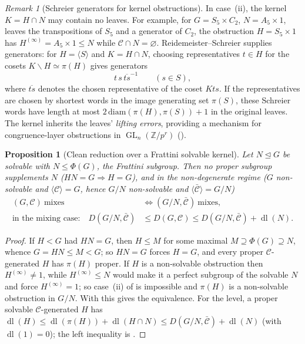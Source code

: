 \documentclass[11pt]{amsart}
\newtheorem{proposition}[proposition]{Proposition}
\theoremstyle{definition}
\theoremstyle{remark}
\newtheorem{remark}[remark]{Remark}
\theoremstyle{plain}
\theoremstyle{plain}
\numberwithin{equation}{section}
\DeclareMathOperator{\GL}{GL}
\newcommand{\Z}{\mathbb{Z}}
\begin{document}
\begin{remark}[Schreier generators for kernel obstructions]
\label{rem:schreier}
In case~(ii), the kernel $K=H\cap N$ may contain no leaves. For example,
for $G=S_5\times C_2$, $N=A_5\times1$, leaves the transpositions of $S_5$ and a
generator of $C_2$, the obstruction $H=S_5\times1$ has $H^{(\infty)}=A_5\times1\le N$ while
$\mathcal C\cap N=\varnothing$. Reidemeister--Schreier supplies generators: for
$H=\langle S\rangle$ and $K=H\cap N$, choosing representatives $t\in H$ for the cosets
$K\backslash H\simeq\pi(H)$ gives generators
\[
t\,s\,\overline{ts}^{-1}\qquad (s\in S),
\]
where $\overline{ts}$ denotes the chosen representative of the coset $Kts$. If the representatives
are chosen by shortest words in the image generating set $\pi(S)$, these Schreier words have length
at most $2\,\mathrm{diam}(\pi(H),\pi(S))+1$ in the original leaves. The kernel inherits the
leaves' \emph{lifting errors}, providing a mechanism for
congruence-layer obstructions in $\GL_n(\Z/p^r)$ ().
\end{remark}

\begin{proposition}[Clean reduction over a Frattini solvable kernel]
\label{prop:frattini}
Let $N\trianglelefteq G$ be solvable with $N\le\Phi(G)$, the Frattini subgroup. Then no proper
subgroup supplements $N$ ($HN=G\Rightarrow H=G$), and in the non-degenerate regime
($G$ non-solvable and $\langle\mathcal C\rangle=G$, hence $G/N$ non-solvable and
$\langle\bar{\mathcal C}\rangle=G/N$)
\[
\begin{aligned}
(G,\mathcal C)\ \text{mixes}
  &\iff(G/N,\bar{\mathcal C})\ \text{mixes},\\
\text{in the mixing case:}\quad D(G/N,\bar{\mathcal C})
  &\le D(G,\mathcal C)
  \le D(G/N,\bar{\mathcal C})+\operatorname{dl}(N).
\end{aligned}
\]
\end{proposition}
\begin{proof}
If $H<G$ had $HN=G$, then $H\le M$ for some maximal $M\supseteq\Phi(G)\supseteq N$, whence
$G=HN\le M<G$; so $HN=G$ forces $H=G$, and every proper $\mathcal C$-generated $H$ has $\pi(H)$
proper. If $H$ is a non-solvable obstruction then $H^{(\infty)}\neq1$, while $H^{(\infty)}\le N$
would make it a perfect subgroup of the solvable $N$ and force $H^{(\infty)}=1$; so case~(ii) of
 is impossible and $\pi(H)$ is a non-solvable obstruction in $G/N$. With
 this gives the equivalence. For the level, a proper solvable $\mathcal
C$-generated $H$ has $\operatorname{dl}(H)\le\operatorname{dl}(\pi(H))+\operatorname{dl}(H\cap
N)\le D(G/N,\bar{\mathcal C})+\operatorname{dl}(N)$ (with $\operatorname{dl}(1)=0$); the left
inequality is .
\end{proof}
\end{document}
